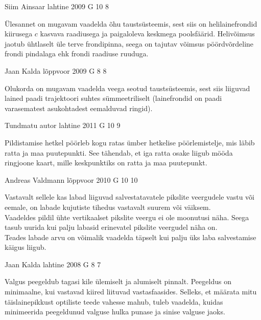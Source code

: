 \documentclass[11pt]{article}
\begin{document}
{%
{Siim Ainsaar} %
{lahtine} %
{2009} %
{G 10} %
{8} %
{

\ifHint
Ülesannet on mugavam vaadelda õhu taustsüsteemis, sest siis on helilainefrondid kiirusega $c$ kasvava raadiusega ja paigaloleva keskmega poolsfäärid. Helivõimsus jaotub ühtlaselt üle terve frondipinna, seega on tajutav võimsus pöördvõrdeline frondi pindalaga ehk frondi raadiuse ruuduga.
\fi
}

{Jaan Kalda} %
{lõppvoor} %
{2009} %
{G 8} %
{8} %
{

\ifHint
Olukorda on mugavam vaadelda veega seotud taustsüsteemis, sest siis liiguvad lained paadi trajektoori suhtes sümmeetriliselt (lainefrondid on paadi varasematest asukohtadest eemalduvad ringid).
\fi
}

{Tundmatu autor} %
{lahtine} %
{2011} %
{G 10} %
{9} %
{

\ifHint
Pildistamise hetkel pöörleb kogu ratas ümber hetkelise pöörlemistelje, mis läbib
ratta ja maa puutepunkti. See tähendab, et iga ratta osake liigub mööda ringjoone kaart, mille keskpunktiks on ratta ja maa puutepunkt.
\fi
}

{Andreas Valdmann} %
{lõppvoor} %
{2010} %
{G 10} %
{10} %
{

\ifHint
\osa
Vastavalt sellele kas labad liiguvad salvestatavatele pikslite veergudele vastu või eemale, on labade kujutiste tihedus vastavalt suurem või väiksem.\\
\osa
Vaadeldes pildil ühte vertikaalset pikslite veergu ei ole moonutusi näha. Seega tasub uurida kui palju labasid erinevatel pikslite veergudel näha on.\\
\osa
Teades labade arvu on võimalik vaadelda täpselt kui palju üks laba salvestamise käigus liigub.
\fi
}

{Jaan Kalda} %
{lahtine} %
{2008} %
{G 8} %
{7} %
{

\ifHint
Valgus peegeldub tagasi kile ülemiselt ja alumiselt pinnalt. Peegeldus on minimaalne, kui vastavad kiired liituvad vastasfaasides. Selleks, et määrata mitu täislainepikkust optiliste teede vahesse mahub, tuleb vaadelda, kuidas minimeerida peegeldunud valguse hulka punase ja sinise valguse jaoks. 
\fi
}

}
\end{document}
